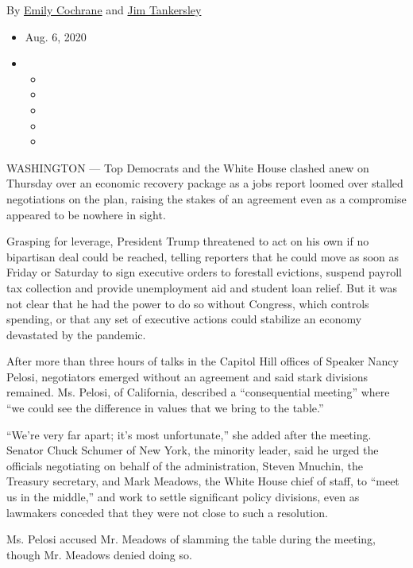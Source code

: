 By \href{https://www.nytimes.com/by/emily-cochrane}{Emily Cochrane} and
\href{https://www.nytimes.com/by/jim-tankersley}{Jim Tankersley}

\begin{itemize}
\item
  Aug. 6, 2020
\item
  \begin{itemize}
  \item
  \item
  \item
  \item
  \item
  \end{itemize}
\end{itemize}

WASHINGTON --- Top Democrats and the White House clashed anew on
Thursday over an economic recovery package as a jobs report loomed over
stalled negotiations on the plan, raising the stakes of an agreement
even as a compromise appeared to be nowhere in sight.

Grasping for leverage, President Trump threatened to act on his own if
no bipartisan deal could be reached, telling reporters that he could
move as soon as Friday or Saturday to sign executive orders to forestall
evictions, suspend payroll tax collection and provide unemployment aid
and student loan relief. But it was not clear that he had the power to
do so without Congress, which controls spending, or that any set of
executive actions could stabilize an economy devastated by the pandemic.

After more than three hours of talks in the Capitol Hill offices of
Speaker Nancy Pelosi, negotiators emerged without an agreement and said
stark divisions remained. Ms. Pelosi, of California, described a
``consequential meeting'' where ``we could see the difference in values
that we bring to the table.''

``We're very far apart; it's most unfortunate,'' she added after the
meeting. Senator Chuck Schumer of New York, the minority leader, said he
urged the officials negotiating on behalf of the administration, Steven
Mnuchin, the Treasury secretary, and Mark Meadows, the White House chief
of staff, to ``meet us in the middle,'' and work to settle significant
policy divisions, even as lawmakers conceded that they were not close to
such a resolution.

Ms. Pelosi accused Mr. Meadows of slamming the table during the meeting,
though Mr. Meadows denied doing so.

